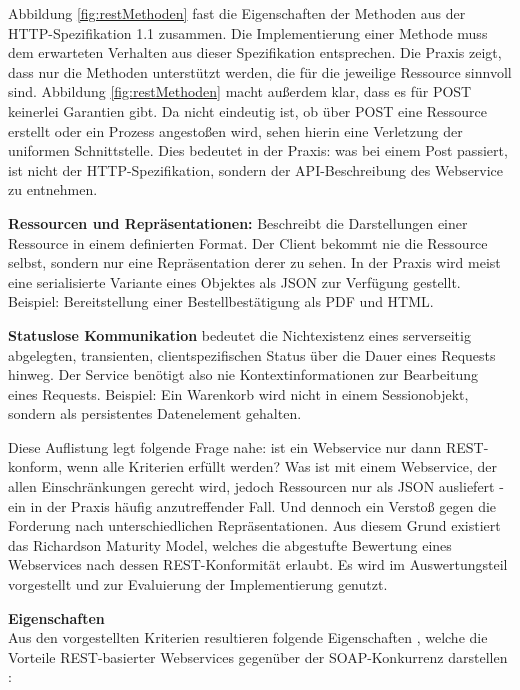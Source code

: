 \documentclass[12pt,a4paper,bibliography=totocnumbered,listof=totoc]{scrartcl}
\begin{document}
\begin{compactitem}
Abbildung \ref{fig:restMethoden} fast die Eigenschaften der Methoden aus der HTTP-Spezifikation 1.1 zusammen. Die Implementierung einer Methode muss dem erwarteten Verhalten aus dieser Spezifikation entsprechen. Die Praxis zeigt, dass nur die Methoden unterstützt werden, die für die jeweilige Ressource sinnvoll sind. Abbildung \ref{fig:restMethoden} macht außerdem klar, dass es für POST keinerlei Garantien gibt. Da nicht eindeutig ist, ob über POST eine Ressource erstellt oder ein Prozess angestoßen wird, sehen \citeauthor{richardson07} hierin eine Verletzung der uniformen Schnittstelle. Dies bedeutet in der Praxis: was bei einem Post passiert, ist nicht der HTTP-Spezifikation, sondern der API-Beschreibung des Webservice zu entnehmen.
\item \textbf{Ressourcen und Repräsentationen:} Beschreibt die Darstellungen einer Ressource in einem definierten Format. Der Client bekommt nie die Ressource selbst, sondern nur eine Repräsentation derer zu sehen. In der Praxis wird meist eine  serialisierte Variante eines Objektes als JSON zur Verfügung gestellt. Beispiel: Bereitstellung einer Bestellbestätigung als PDF und HTML.
\item \textbf{Statuslose Kommunikation} bedeutet die Nichtexistenz eines serverseitig abgelegten, transienten, clientspezifischen Status über die Dauer eines Requests hinweg. Der Service benötigt also nie Kontextinformationen zur Bearbeitung eines Requests. Beispiel: Ein Warenkorb wird nicht in einem Sessionobjekt, sondern als persistentes Datenelement gehalten.
\end{compactitem}

Diese Auflistung legt folgende Frage nahe: ist ein Webservice nur dann REST-konform, wenn alle Kriterien erfüllt werden? Was ist mit einem Webservice, der allen Einschränkungen gerecht wird, jedoch Ressourcen nur als JSON ausliefert - ein in der Praxis häufig anzutreffender Fall. Und dennoch ein Verstoß gegen die Forderung nach unterschiedlichen Repräsentationen. Aus diesem Grund existiert das \glqq Richardson Maturity Model\grqq{}, welches die abgestufte Bewertung eines Webservices nach dessen REST-Konformität erlaubt. Es wird im Auswertungsteil vorgestellt und zur Evaluierung der Implementierung genutzt.

\textbf{Eigenschaften}\\
Aus den vorgestellten Kriterien resultieren folgende Eigenschaften \citep{tilkov11},  welche die Vorteile REST-basierter Webservices gegenüber der SOAP-Konkurrenz darstellen \citep{richardson07}:
\end{document}
